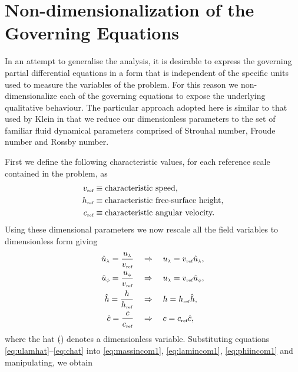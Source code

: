 \section{Non-dimensionalization of the Governing Equations}
In an attempt to generalise the analysis, it is desirable to express the governing partial differential equations in a form that is independent of the specific units used to measure the variables of the problem. For this reason we non-dimensionalize each of the governing equations to expose the underlying qualitative behaviour. The particular approach adopted here is similar to that used by Klein \cite[page 766]{Klein:AAA} in that we reduce our dimensionless parameters to the set of familiar fluid dynamical parameters comprised of Strouhal number, Froude number and Rossby number. 

First we define the following characteristic values, for each reference scale contained in the problem, as
\begin{align*}
v_{\mbox{\tiny ref}} & \equiv \mbox{characteristic speed,}\\
h_{\mbox{\tiny ref}} & \equiv \mbox{characteristic free-surface height,} \\
c_{\mbox{\tiny ref}} & \equiv \mbox{characteristic angular velocity.}
\end{align*}
Using these dimensional parameters we now rescale all the field variables to dimensionless form giving
\begin{align}
\hat{u}_{\scriptscriptstyle \lambda}=\frac{{u_{\scriptscriptstyle \lambda}}}{v_{\mbox{\tiny ref}}} \quad & \Rightarrow \quad {\ensuremath{u_{\scriptscriptstyle \lambda}}} = v_{\mbox{\tiny ref}} \hat{u}_{\scriptscriptstyle \lambda}, \label{eq:ulamhat}\\
\hat{u}_{\scriptscriptstyle \phi}=\frac{{u_{\scriptscriptstyle \phi}}}{v_{\mbox{\tiny ref}}} \quad & \Rightarrow \quad {\ensuremath{u_{\scriptscriptstyle \lambda}}} = v_{\mbox{\tiny ref}} \hat{u}_{\scriptscriptstyle \phi}, \label{eq:uphihat}\\
\hat{h}=\frac{h}{h_{\mbox{\tiny ref}}} \quad & \Rightarrow \quad h = h_{\mbox{\tiny ref}} \hat{h}, \label{eq:hhat}\\
\hat{c}=\frac{c}{c_{\mbox{\tiny ref}}} \quad & \Rightarrow \quad c = c_{\mbox{\tiny ref}} \hat{c}, \label{eq:chat}
\end{align}
where the hat ($\hat{}$) denotes a dimensionless variable. Substituting equations \eqref{eq:ulamhat}--\eqref{eq:chat} into \eqref{eq:massincom1}, \eqref{eq:lamincom1},  \eqref{eq:phiincom1} and manipulating, we obtain

